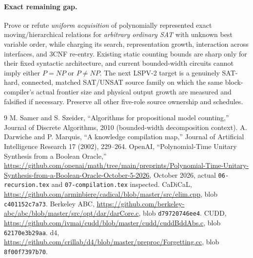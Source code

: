 \documentclass[11pt]{article}
\begin{document}
\paragraph{Exact remaining gap.} Prove or refute \emph{uniform acquisition} of polynomially represented exact moving/hierarchical relations for \emph{arbitrary ordinary SAT} with unknown best variable order, while charging its search, representation growth, interaction across interfaces, and 3CNF re-entry. Existing static counting bounds are sharp only for their fixed syntactic architecture, and current bounded-width circuits cannot imply either $P=NP$ or $P\ne NP$. The next LSPV-2 target is a genuinely SAT-hard, connected, matched SAT/UNSAT source family on which the same block-compiler's actual frontier size and physical output growth are measured and falsified if necessary. Preserve all other five-role source ownership and schedules.

\begin{thebibliography}{9}
 M. Samer and S. Szeider, ``Algorithms for propositional model counting,'' Journal of Discrete Algorithms, 2010 (bounded-width decomposition context).
 A. Darwiche and P. Marquis, ``A knowledge compilation map,'' Journal of Artificial Intelligence Research 17 (2002), 229--264.
 OpenAI, ``Polynomial-Time Unitary Synthesis from a Boolean Oracle,'' \url{https://github.com/openai/math/tree/main/preprints/Polynomial-Time-Unitary-Synthesis-from-a-Boolean-Oracle-October-5-2026}, October 2026, actual \texttt{06-recursion.tex} and \texttt{07-compilation.tex} inspected.
 CaDiCaL, \url{https://github.com/arminbiere/cadical/blob/master/src/elim.cpp}, blob \texttt{c401152c7a73}.
 Berkeley ABC, \url{https://github.com/berkeley-abc/abc/blob/master/src/opt/dar/darCore.c}, blob \texttt{d79720746ee4}.
 CUDD, \url{https://github.com/ivmai/cudd/blob/master/cudd/cuddBddAbs.c}, blob \texttt{62170e3b29aa}.
 d4, \url{https://github.com/crillab/d4/blob/master/preproc/Forgetting.cc}, blob \texttt{8f00f7397b70}.
\end{thebibliography}
\end{document}
